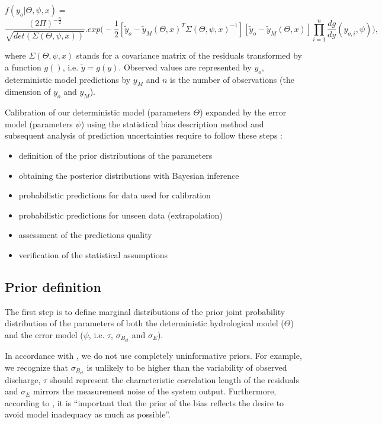\documentclass{ctuthesis}\usepackage[]{graphicx}\usepackage[]{color}
\begin{document}
$ f (y_{o}|\Theta, \psi, x) = $
\begin{equation}
 \frac{(2\Pi)^{-\frac{n}{2}}}{\sqrt{det(\Sigma(\Theta, \psi, x))}}  . exp \Big( -\frac{1}{2}  [ \tilde{y}_{o} - \tilde{y}_{M}(\Theta, x)^{T}  \Sigma(\Theta, \psi, x)^{-1} ]  [ \tilde{y}_{o} - \tilde{y}_{M}(\Theta, x)]  \prod^{n}_{i=1} \frac{dg}{dy} (y_{o,i},\psi) \Big),
\end{equation}

where $\Sigma(\Theta, \psi, x)$ stands for a covariance matrix of the residuals transformed by a function $g()$, i.e. $\tilde{y}=g(y)$. Observed values are represented by $y_{o}$, deterministic model predictions by $y_{M}$ and $n$ is the number of observations (the dimension of $y_{o}$ and $y_{M}$).


Calibration of our deterministic model (parameters $\Theta$) expanded by the error model (parameters $\psi$) using the statistical bias description method and subsequent analysis of prediction uncertainties require to follow these steps \citep{giudice2013improving}:
\begin{itemize}
	\item  definition of the prior distributions of the parameters
	\item  obtaining the posterior distributions with Bayesian inference
	\item  probabilistic predictions for  data used for calibration
	\item  probabilistic predictions for unseen data (extrapolation)
	\item  assessment of the predictions quality
	\item verification of the statistical assumptions
\end{itemize}



\subsection{Prior definition}
The first step is to define marginal distributions of the prior joint probability distribution of the parameters of  both the deterministic hydrological model ($\Theta$) and the error model ($\psi$, i.e. $\tau$,  $\sigma_{B_{ct}}$ and  $\sigma_E$). 

In accordance with \cite{giudice2013improving}, we do not use  completely uninformative priors. For example, we recognize that $\sigma_{B_{ct}}$ is unlikely to be higher than the variability of observed discharge, $\tau$ should represent the characteristic correlation length of the residuals and  $\sigma_E$ mirrors the measurement noise of the system output. Furthermore, according to \cite{giudice2013improving}, it is \enquote{important that the prior of the bias reflects the desire to avoid model inadequacy as much as possible}. 
\end{document}
